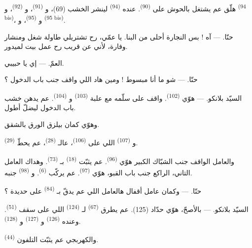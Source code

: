 هلّق عم يشتغل بالحوش على  \textsuperscript{(90)}.
عنده  \textsuperscript{(94)} لينشر الخشب (69)،
و \textsuperscript{(91)}، و \textsuperscript{(92)}،
و \textsuperscript{(94 bis)}، و
\textsuperscript{(95)}، و \textsuperscript{(95 bis)}.

\textsc{حنّا}. --- آه ! بس النجارة أحلى من البنا. يا عمّي، رح تشتريلي
طاولة شغل ومنشار وفارة، لأني عن قريب رح عمل بيت لميدور.

\textsc{العمّ}. --- إي يا حبيبي.

\textsc{حنّا}. --- شو ما أنا مبسوط ! ومين هاد اللي واقف جنب باب
الدخول ؟

\VUsaut{3.0mm}
\VUsaut{3.0mm}

\textsc{السيّد بلانكو}. --- هوّي  \textsuperscript{(102)}.
واقف على سلّمه مع علبة  \textsuperscript{(103)}
و \textsuperscript{(104)}. عم يدهن خشب باب الدخول ليضلّ
أطول.

وهوّي كمان بيلزق الورق بالشقق.

و \textsuperscript{(107)} اللي على 
\textsuperscript{(106)}، عالـ \textsuperscript{(28)}، عم
يحطّ  \textsuperscript{(29)}.

والعامل الواقف جنب الشبّاك الكبير هوّي 
\textsuperscript{(96)}. عم يثبّت  \textsuperscript{(18)}
بـ \textsuperscript{(73)}. وهداك العامل التاني، الراكع جنب
باب القبو، هوّي  \textsuperscript{(97)}. عم يركّب
 \textsuperscript{(6)}. و \textsuperscript{(98)}
جنبه.

\textsc{حنّا}. --- وكمان عامل أقفال هالعامل اللي عم يدقّ
بـ \textsuperscript{(84)} على حديدة ؟

\textsc{السيّد بلانكو}. --- بالأصحّ، هوّي حدّاد (125). عم يطرق
 \textsuperscript{(67)} لـ \textsuperscript{(124)}
اللي على سقف  \textsuperscript{(51)}. وعنده 
\textsuperscript{(126)} و \textsuperscript{(127)}
و \textsuperscript{(128)}.

والكهربجي عم يثبّت  التلفون 
\textsuperscript{(44)}.

